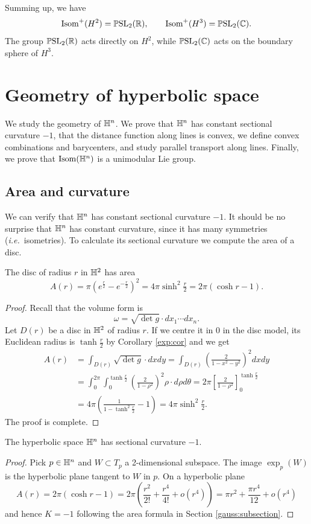 Summing up, we have
$${\rm Isom}^+(H^2) = \mathbb{P}{\rm SL}_2(\mathbb{R}), \qquad {\rm Isom}^+(H^3) = \mathbb{P}{\rm SL}_2(\mathbb{C}).$$
The group $\mathbb{P}{\rm SL}_2(\mathbb{R})$ acts directly on $H^2$, while $\mathbb{P}{\rm SL}_2(\mathbb{C})$ acts on the boundary sphere of $H^3$.

\section{Geometry of hyperbolic space}
We study the geometry of $\mathbb{H}^n$. We prove that $\mathbb{H}^n$ has constant sectional curvature $-1$, that the distance function along lines is convex, we define convex combinations and barycenters, and study parallel transport along lines. Finally, we prove that ${\rm Isom}(\mathbb{H}^n)$ is a unimodular Lie group.

\subsection{Area and curvature}
We can verify that $\mathbb{H}^n$ has constant sectional curvature $-1$. It should be no surprise that $\mathbb{H}^n$ has constant curvature, since it has many symmetries (\emph{i.e.}~isometries). To calculate its sectional curvature we compute the area of a disc. 

\begin{prop}
The disc of radius $r$ in $\mathbb{H}^2$ has area 
$$A(r) = \pi \left(e^{\frac r2} -e ^{-\frac r2}\right)^2 =  4\pi \sinh^2 {\tfrac r2} = 2\pi (\cosh r -1).$$
\end{prop}
\begin{proof}
Recall that the volume form is
$$\omega = \sqrt{\det g} \cdot dx_1\cdots dx_n.$$
Let $D(r)$ be a disc in $\mathbb{H}^2$ of radius $r$. If we centre it in $0$ in the disc model, its Euclidean radius is $\tanh \frac r2$ by Corollary \ref{exp:cor} and we get
\begin{align*}
A(r) & = \int_{D(r)} \sqrt{\det g} \cdot dxdy = \int_{D(r)} \left(\frac 2{1-x^2-y^2}\right)^2dxdy \\
 & = \int_0^{2\pi} \int_0^{\tanh\frac r2} \left(\frac {2}{1-\rho^2}\right)^2 \rho \cdot d\rho d\theta = 2\pi\left[ \frac 2{1-\rho^2}\right]_0^{\tanh \frac r2} \\
 & = 4\pi \left(\frac 1{1-{\tanh^2 \frac r2}} - 1 \right) = 4\pi \sinh^2 \tfrac r2.
\end{align*}
The proof is complete.
\end{proof}

\begin{cor}
The hyperbolic space $\mathbb{H}^n$ has sectional curvature $-1$.
\end{cor}
\begin{proof}
Pick $p\in \mathbb{H}^n$ and $W\subset T_p$ a 2-dimensional subspace. The image $\exp_p(W)$ is the hyperbolic plane tangent to $W$ in $p$. On a hyperbolic plane 
$$A(r) = 2\pi(\cosh r - 1) = 2\pi \left(\frac {r^2}{2!} + \frac {r^4}{4!} + o(r^4)\right) = \pi r^2 + \frac{\pi r^4}{12} + o(r^4)$$
and hence $K=-1$ following the area formula in Section \ref{gauss:subsection}.
\end{proof}

